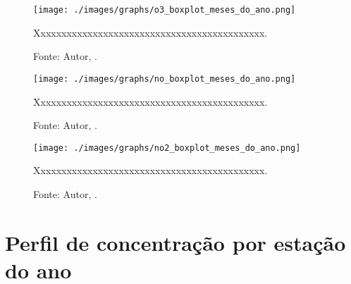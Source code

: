 


\begin{figure}[H]
    \centering
    \texttt{[image: ./images/graphs/o3\_boxplot\_meses\_do\_ano.png]}
    \caption{Xxxxxxxxxxxxxxxxxxxxxxxxxxxxxxxxxxxxxxxxxxxx.}
    \label{fig:o3_boxplot_meses_do_ano.png}
    \caption*{Fonte: Autor, \imprimirdata.}
\end{figure}




\begin{figure}[H]
    \centering
    \texttt{[image: ./images/graphs/no\_boxplot\_meses\_do\_ano.png]}
    \caption{Xxxxxxxxxxxxxxxxxxxxxxxxxxxxxxxxxxxxxxxxxxxx.}
    \label{fig:no_boxplot_meses_do_ano.png}
    \caption*{Fonte: Autor, \imprimirdata.}
\end{figure}




\begin{figure}[H]
    \centering
    \texttt{[image: ./images/graphs/no2\_boxplot\_meses\_do\_ano.png]}
    \caption{Xxxxxxxxxxxxxxxxxxxxxxxxxxxxxxxxxxxxxxxxxxxx.}
    \label{fig:no2_boxplot_meses_do_ano.png}
    \caption*{Fonte: Autor, \imprimirdata.}
\end{figure}





\section{Perfil de concentração por estação do ano}

